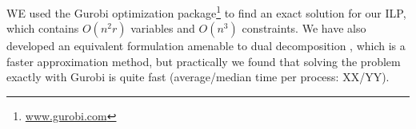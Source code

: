 WE used the Gurobi optimization package\footnote{\url{www.gurobi.com}} to find an exact solution for our ILP, which contains $O(n^2r)$ variables and $O(n^3)$ constraints. We have also developed an equivalent formulation amenable to dual decomposition \cite{Reichart12}, which is a faster approximation method, but practically we found that solving the problem exactly with Gurobi is quite fast (average/median time per process: XX/YY).



